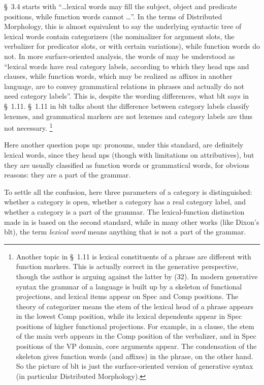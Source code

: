\documentclass[UTF8, a4paper, oneside, scheme=plain]{ctexart}
\newcommand*{\citesec}[1]{\S~{#1}}
\newcommand*{\term}[1]{\emph{#1}}
\begin{document}
\citesec{3.4} starts with 
``\dots lexical words may fill the subject, object and predicate positions,
while function words cannot \dots''.
In the terms of Distributed Morphology,
this is almost equivalent to say the underlying syntactic tree of lexical words contain categorizers 
(the nominalizer for argument slots, the verbalizer for predicator slots,
or with certain variations),
while function words do not.
In more surface-oriented analysis,
the words of \citet[3.4]{zhudexigrammar} may be understood as 
``lexical words have real category labels, according to which 
they head \ac{np}s and clauses,
while function words, which may be realized as affixes in another language,
are to convey grammatical relations in phrases 
and actually do not need category labels''.
This is, despite the wording differences, 
what \ac{blt} says in \citesec{1.11}.
\citesec{1.11} in \ac{blt} talks about the difference between 
category labels classify lexemes,
and grammatical markers are not lexemes and category labels are thus not necessary.%
\footnote{
    Another topic in \citesec{1.11} is lexical constituents of a phrase are different with 
    function markers.
    This is actually correct in the generative perspective,
    though the author is arguing against the latter by (32).
    In modern generative syntax the grammar of a language is built up by 
    a skeleton of functional projections,
    and lexical items appear on Spec and Comp positions.
    The theory of categorizer means 
    the stem of the lexical head of a phrase appears in the lowest Comp position,
    while its lexical dependents appear in Spec positions of higher functional projections.
    For example,
    in a clause, the stem of the main verb appears in the Comp position of the verbalizer,
    and in Spec positions of the VP domain,
    core arguments appear.
    The condensation of the skeleton gives function words (and affixes) in the phrase,
    on the other hand.
    So the picture of \ac{blt} is just the surface-oriented version of generative syntax
    (in particular Distributed Morphology).
}

Here another question pops up:
pronouns, under this standard, are definitely lexical words,
since they head \ac{np}s (though with limitations on attributives),
but they are usually classified as function words or grammatical words,
for obvious reasons: they are a part of the grammar.

To settle all the confusion, here three parameters of a category is distinguished:
whether a category is open, 
whether a category has a real category label,
and whether a category is a part of the grammar.
The lexical-function distinction made in \citet{zhudexigrammar}
is based on the second standard,
while in many other works (like Dixon's \ac{blt}), 
the term \term{lexical word} means anything that is not a part of the grammar.
\end{document}
